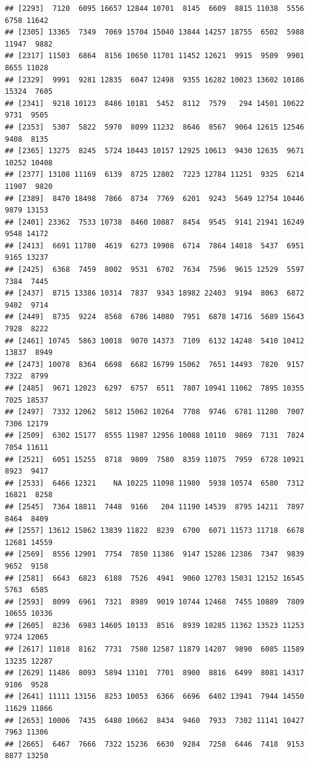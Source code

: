 \documentclass[
]{article}
\begin{document}
\begin{verbatim}
## [2293]  7120  6095 16657 12844 10701  8145  6609  8815 11038  5556  6758 11642
## [2305] 13365  7349  7069 15704 15040 13844 14257 18755  6502  5988 11947  9882
## [2317] 11503  6864  8156 10650 11701 11452 12621  9915  9509  9901  8655 11028
## [2329]  9991  9281 12835  6047 12498  9355 16282 10023 13602 10186 15324  7605
## [2341]  9218 10123  8486 10181  5452  8112  7579   294 14501 10622  9731  9505
## [2353]  5307  5822  5970  8099 11232  8646  8567  9064 12615 12546  9408  8135
## [2365] 13275  8245  5724 10443 10157 12925 10613  9430 12635  9671 10252 10408
## [2377] 13108 11169  6139  8725 12802  7223 12784 11251  9325  6214 11907  9820
## [2389]  8470 18498  7866  8734  7769  6201  9243  5649 12754 10446  9879 13153
## [2401] 23362  7533 10738  8460 10887  8454  9545  9141 21941 16249  9548 14172
## [2413]  6691 11780  4619  6273 19908  6714  7864 14018  5437  6951  9165 13237
## [2425]  6368  7459  8002  9531  6702  7634  7596  9615 12529  5597  7384  7445
## [2437]  8715 13386 10314  7837  9343 18982 22403  9194  8063  6872  9402  9714
## [2449]  8735  9224  8568  6786 14080  7951  6878 14716  5689 15643  7928  8222
## [2461] 10745  5863 10018  9070 14373  7109  6132 14248  5410 10412 13837  8949
## [2473] 10078  8364  6698  6682 16799 15062  7651 14493  7820  9157  7322  8799
## [2485]  9671 12023  6297  6757  6511  7807 10941 11062  7895 10355  7025 18537
## [2497]  7332 12062  5812 15062 10264  7708  9746  6781 11280  7007  7306 12179
## [2509]  6302 15177  8555 11987 12956 10088 10110  9869  7131  7824  7054 11611
## [2521]  6051 15255  8718  9809  7580  8359 11075  7959  6728 10921  8923  9417
## [2533]  6466 12321    NA 10225 11098 11980  5938 10574  6580  7312 16821  8258
## [2545]  7364 18811  7448  9166   204 11190 14539  8795 14211  7897  8464  8409
## [2557] 13612 15862 13839 11822  8239  6700  6071 11573 11718  6678 12681 14559
## [2569]  8556 12901  7754  7850 11386  9147 15286 12386  7347  9839  9652  9158
## [2581]  6643  6823  6188  7526  4941  9060 12703 15031 12152 16545  5763  6585
## [2593]  8099  6961  7321  8989  9019 10744 12468  7455 10889  7809 10655 10336
## [2605]  8236  6983 14605 10133  8516  8939 10285 11362 13523 11253  9724 12065
## [2617] 11018  8162  7731  7580 12587 11879 14207  9890  6085 11589 13235 12287
## [2629] 11486  8093  5894 13101  7701  8900  8816  6499  8081 14317  9106  9528
## [2641] 11111 13156  8253 10053  6366  6696  6402 13941  7944 14550 11629 11866
## [2653] 10006  7435  6480 10662  8434  9460  7933  7302 11141 10427  7963 11306
## [2665]  6467  7666  7322 15236  6630  9284  7258  6446  7418  9153  8877 13250

\end{verbatim}
\end{document}

